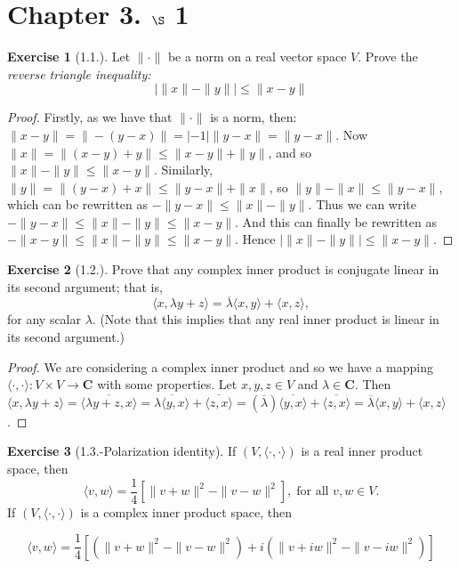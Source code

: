 \documentclass[9pt,reqno]{amsart}
\theoremstyle{definition}
\newtheorem{exercise}{Exercise}[section]
\newcommand{\cc}{\mathbf C}
\begin{document}
\section{Chapter 3. $\S$ 1}
\begin{exercise}[1.1.] Let $\| \cdot \|$ be a norm on a real vector space $V$. Prove the \textit{reverse triangle inequality:}
\[ | \|x \| - \|y \| | \leq  \| x-y \| 
\]
\end{exercise}
\begin{proof}
	Firstly, as we have that $\| \cdot \|$ is a norm, then: $\|x-y\| = \|-(y-x)\| = |-1| \|y-x\| = \|y-x\|$. Now $\|x \| = \|(x-y) + y \| \leq \|x-y \| + \|y\| $, and so $\|x\|- \|y\| \leq \|x-y\|$. Similarly, $\|y \| = \|(y-x)+x \| \leq \|y-x\| + \|x \|$, so $\|y\|- \|x\| \leq \|y-x\|$, which can be rewritten as $-\|y-x \| \leq \|x\|-\|y\|$. Thus we can write $ - \|y-x\| \leq \|x\|- \|y \| \leq \|x-y\|$. And this can finally be rewritten as $- \|x-y\| \leq \|x\|-\|y\| \leq \|x-y\|$. Hence $\left | \|x\|-\|y\| \right| \leq \|x-y\|$. 
\end{proof}
\begin{exercise}[1.2.] Prove that any complex inner product is conjugate linear in its second argument; that is,
\[ \langle x, \lambda y + z \rangle = \overline{\lambda}\langle x, y \rangle + \langle x, z \rangle ,
\] for any scalar $\lambda$. (Note that this implies that any real inner product is linear in its second argument.)
\end{exercise}
\begin{proof} We are considering a complex inner product and so we have a mapping $\langle \cdot, \cdot \rangle \colon V\times V \to \cc$ with some properties. Let $x, y, z \in V$ and $\lambda \in \cc$. Then $\langle x, \lambda y+z \rangle = \overline{\langle \lambda y+z, x \rangle} = \overline{\lambda \langle y, x \rangle} + \overline {\langle z, x\rangle} = ( \overline{ \lambda } ) \overline{\langle y, x \rangle} + \overline{\langle z, x\rangle} = \overline{\lambda} \langle x,y\rangle + \langle x, z \rangle$. 
\end{proof}
\begin{exercise}[1.3.-Polarization identity]  If $(V, \langle \cdot, \cdot \rangle)$ is a real inner product space, then 
\[ \langle v, w \rangle = \frac{1}{4} \left [ \| v+w \|^2 - \|v - w \|^2 \right ], \; \text{for all $v, w \in V$.}
\]
If $(V, \langle \cdot, \cdot \rangle )$ is a complex inner product space, then 

\[ 
\langle v , w \rangle = \frac{1}{4} \left [ ( \|v + w \|^2 - \|v - w \|^2) + i( \| v + i w \|^2 - \|v-iw\|^2) \right] 
\] 
	
\end{exercise}
\end{document}
